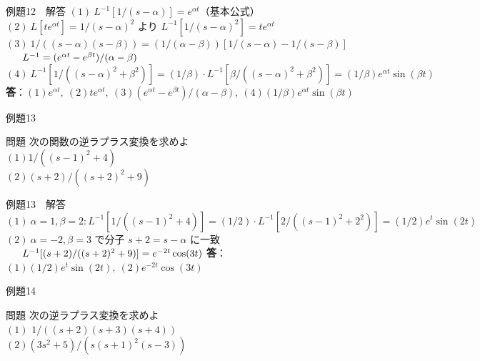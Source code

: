\documentclass[professionalfonts]{beamer}
\begin{document}
\begin{frame}{例題12　解答}
  $(1)\ L^{-1}[1/(s-\alpha)] = e^{\alpha t}$（基本公式）\\[4pt]
  $(2)\ L[t e^{\alpha t}] = 1/(s-\alpha)^{2}$ より $L^{-1}[1/(s-\alpha)^{2}] = t e^{\alpha t}$\\[4pt]
  $(3)\ 1/((s-\alpha)(s-\beta)) = (1/(\alpha-\beta))[1/(s-\alpha) - 1/(s-\beta)]$\\[4pt]
  $\hphantom{(3)\ }L^{-1} = (e^{\alpha t} - e^{\beta t})/(\alpha-\beta)$\\[4pt]
  $(4)\ L^{-1}[1/((s-\alpha)^{2}+\beta^{2})] = (1/\beta)\cdot L^{-1}[\beta/((s-\alpha)^{2}+\beta^{2})] = (1/\beta)e^{\alpha t}\sin(\beta t)$
  \medskip\textbf{答}：$(1) e^{\alpha t},\ (2) t e^{\alpha t},\ (3) (e^{\alpha t}-e^{\beta t})/(\alpha-\beta),\ (4) (1/\beta)e^{\alpha t}\sin(\beta t)$
\end{frame}

\begin{frame}{例題13}
  \begin{exampleblock}{問題}
    次の関数の逆ラプラス変換を求めよ\\[2pt]
    $(1) 1/((s-1)^{2}+4)$\\[2pt]
    $(2) (s+2)/((s+2)^{2}+9)$\\[2pt]
  \end{exampleblock}
\end{frame}

\begin{frame}{例題13　解答}
  $(1)\ \alpha=1, \beta=2: L^{-1}[1/((s-1)^{2}+4)] = (1/2)\cdot L^{-1}[2/((s-1)^{2}+2^{2})] = (1/2)e^t \sin(2t)$\\[4pt]
  $(2)\ \alpha=-2, \beta=3$ で分子 $s+2 = s-\alpha$ に一致\\[4pt]
  $\hphantom{(2)\ }L^{-1}[(s+2)/((s+2)^{2}+9)] = e^{-2t}\cos(3t)$
  \medskip\textbf{答}：$(1) (1/2)e^t \sin(2t),\ (2) e^{-2t}\cos(3t)$
\end{frame}

\begin{frame}{例題14}
  \begin{exampleblock}{問題}
    次の逆ラプラス変換を求めよ\\[2pt]
    $(1)$ $1/((s+2)(s+3)(s+4))$\\[2pt]
    $(2) (3s^{2}+5) / (s(s+1)^{2}(s-3))$\\[2pt]
  \end{exampleblock}
\end{frame}
\end{document}
